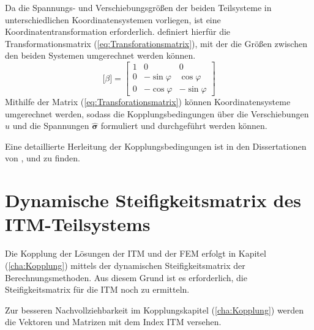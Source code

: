  Da die Spannungs- und Verschiebungsgrößen der beiden Teilsysteme in unterschiedlichen Koordinatensystemen vorliegen, ist eine Koordinatentransformation erforderlich.
 \cite{Fruehe2010} definiert hierfür die Transformationsmatrix (\ref{eq:Transforationsmatrix}), mit der die Größen zwischen den beiden Systemen umgerechnet werden können.
\begin{equation} \label{eq:Transforationsmatrix}
\bigl[\beta\bigr]
= \begin{bmatrix}
	1 & 0 & 0 \\
	0 & -\sin\varphi & \cos\varphi \\
	0 & -\cos\varphi & -\sin\varphi
\end{bmatrix}
\end{equation}
Mithilfe der Matrix (\ref{eq:Transforationsmatrix}) können Koordinatensysteme umgerechnet werden, sodass die Kopplungsbedingungen über die Verschiebungen $\hat{u} $ und die Spannungen $ \hat{\mathbf{\sigma}} $ formuliert und durchgeführt werden können.

Eine detaillierte Herleitung der Kopplungsbedingungen ist in den Dissertationen von \cite{Fruehe2010}, \cite{Hackenberg2016} und \cite{Freisinger2022} zu finden.


\newpage


\section{Dynamische Steifigkeitsmatrix des ITM-Teilsystems}
\label{sec:Steifigkeiten_ITM}

Die Kopplung der Lösungen der ITM und der FEM erfolgt in Kapitel (\ref{cha:Kopplung}) mittels der dynamischen Steifigkeitsmatrix der Berechnungsmethoden. Aus diesem Grund ist es erforderlich, die Steifigkeitsmatrix für die ITM noch zu ermitteln.

Zur besseren Nachvollziehbarkeit im Kopplungskapitel (\ref{cha:Kopplung}) werden die Vektoren und Matrizen mit dem Index ITM versehen.

